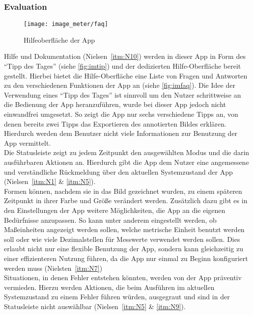 \subsubsection{Evaluation}\label{subsec:imeva}
\begin{wrapfigure}{R}{0.5\textwidth}
  \centering
  \texttt{[image: image\_meter/faq]}
  \caption{Hilfeoberfläche der App}
  \label{fig:imfaq}
\end{wrapfigure}

Hilfe und Dokumentation (Nielsen~\autoref{itm:N10}) werden in dieser App in Form des ``Tipp des Tages'' (siehe \autoref{fig:imtip}) und der dedizierten Hilfe-Oberfläche bereit gestellt.
Hierbei bietet die Hilfe-Oberfläche eine Liste von Fragen und Antworten zu den verschiedenen Funktionen der App an (siehe \autoref{fig:imfaq}). 
Die Idee der Verwendung eines ``Tipp des Tages'' ist sinnvoll um den Nutzer schrittweise an die Bedienung der App heranzuführen, wurde bei dieser App jedoch nicht einwandfrei umgesetzt.
So zeigt die App nur sechs verschiedene Tipps an, von denen bereits zwei Tipps das Exportieren des annotierten Bildes erklären.
Hierdurch werden dem Benutzer nicht viele Informationen zur Benutzung der App vermittelt. \\

Die Statusleiste zeigt zu jedem Zeitpunkt den ausgewählten Modus und die darin ausführbaren Aktionen an.
Hierdurch gibt die App dem Nutzer eine angemessene und verständliche Rückmeldung über den aktuellen Systemzustand der App (Nielsen~\autoref{itm:N1} \& \autoref{itm:N5}). \\

Formen können, nachdem sie in das Bild gezeichnet wurden, zu einem späteren Zeitpunkt in ihrer Farbe und Größe verändert werden.
Zusätzlich dazu gibt es in den Einstellungen der App weitere Möglichkeiten, die App an die eigenen Bedürfnisse anzupassen.
So kann unter anderem eingestellt werden, ob Maßeinheiten angezeigt werden sollen, welche metrische Einheit benutzt werden soll oder wie viele Dezimalstellen für Messwerte verwendet werden sollen.
Dies erlaubt nicht nur eine flexible Benutzung der App, sondern kann gleichzeitig zu einer effizienteren Nutzung führen, da die App nur einmal zu Beginn konfiguriert werden muss (Nielsten~\autoref{itm:N7}) \\

Situationen, in denen Fehler entstehen könnten, werden von der App präventiv vermieden.
Hierzu werden Aktionen, die beim Ausführen im aktuellen Systemzustand zu einem Fehler führen würden, ausgegraut und sind in der Statusleiste nicht auswählbar (Nielsen~\autoref{itm:N5} \& \autoref{itm:N9}). \\

